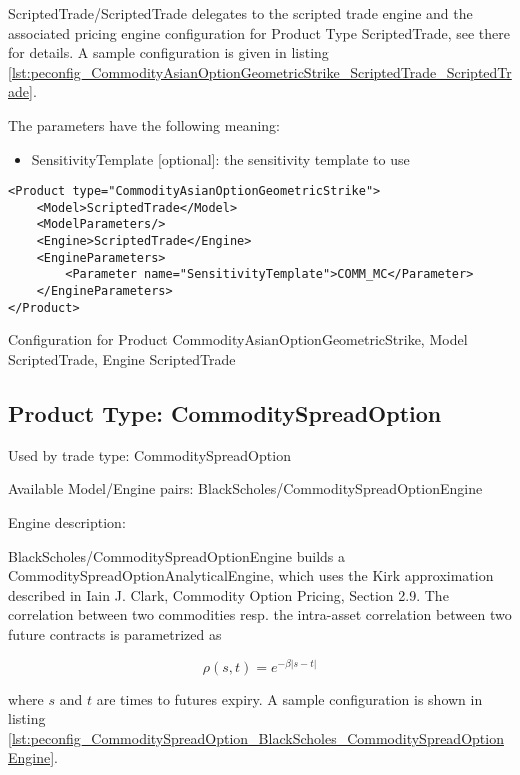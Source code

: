ScriptedTrade/ScriptedTrade delegates to the scripted trade engine and the associated pricing engine configuration for
Product Type ScriptedTrade, see there for details. A sample configuration is given in listing
\ref{lst:peconfig_CommodityAsianOptionGeometricStrike_ScriptedTrade_ScriptedTrade}.

The parameters have the following meaning:

\begin{itemize}
\item SensitivityTemplate [optional]: the sensitivity template to use 
\end{itemize}

\begin{longlisting}
\begin{verbatim}
<Product type="CommodityAsianOptionGeometricStrike">
    <Model>ScriptedTrade</Model>
    <ModelParameters/>
    <Engine>ScriptedTrade</Engine>
    <EngineParameters>
        <Parameter name="SensitivityTemplate">COMM_MC</Parameter>
    </EngineParameters>
</Product>
\end{verbatim}
\caption{Configuration for Product CommodityAsianOptionGeometricStrike, Model ScriptedTrade, Engine ScriptedTrade}
\label{lst:peconfig_CommodityAsianOptionGeometricStrike_ScriptedTrade_ScriptedTrade}
\end{longlisting}

\subsection{Product Type: CommoditySpreadOption}

Used by trade type: CommoditySpreadOption

Available Model/Engine pairs: BlackScholes/CommoditySpreadOptionEngine

Engine description:

BlackScholes/CommoditySpreadOptionEngine builds a CommoditySpreadOptionAnalyticalEngine, which uses the Kirk
approximation described in Iain J. Clark, Commodity Option Pricing, Section 2.9. The correlation between two commodities
resp. the intra-asset correlation between two future contracts is parametrized as

$$\rho(s, t) = e^{-\beta |s-t|}$$

where $s$ and $t$ are times to futures expiry. A sample configuration is shown in listing
\ref{lst:peconfig_CommoditySpreadOption_BlackScholes_CommoditySpreadOptionEngine}.

